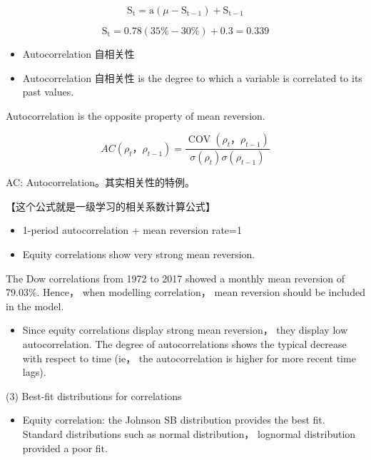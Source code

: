 \[
{\mathrm{S}}_{\mathrm{t}} = \mathrm{a}\left( {\mu  - {\mathrm{S}}_{\mathrm{t} - 1}}\right)  + {\mathrm{S}}_{\mathrm{t} - 1}
\]

\[
{\mathrm{S}}_{\mathrm{t}} = {0.78}\left( {{35}\%  - {30}\% }\right)  + {0.3} = {0.339}
\]


\begin{itemize}
\item Autocorrelation 自相关性
\end{itemize}

\begin{itemize}
\item Autocorrelation 自相关性 is the degree to which a variable is correlated to its past values.
\end{itemize}

 Autocorrelation is the opposite property of mean reversion.

\[
{AC}\left( {{\rho }_{t}，{\rho }_{t - 1}}\right)  = \frac{\operatorname{COV}\left( {{\rho }_{t}，{\rho }_{t - 1}}\right) }{\sigma \left( {\rho }_{t}\right) \sigma \left( {\rho }_{t - 1}\right) }
\]

AC: Autocorrelation。其实相关性的特例。

【这个公式就是一级学习的相关系数计算公式】

\begin{itemize}
\item 1-period autocorrelation + mean reversion rate=1
\end{itemize}

\begin{itemize}
\item Equity correlations show very strong mean reversion.
\end{itemize}

 The Dow correlations from 1972 to 2017 showed a monthly mean reversion of 79.03\%. Hence， when modelling correlation， mean reversion should be included in the model.

\begin{itemize}
\item Since equity correlations display strong mean reversion， they display low autocorrelation. The degree of autocorrelations shows the typical decrease with respect to time (ie， the autocorrelation is higher for more recent time lags).
\end{itemize}

(3) Best-fit distributions for correlations

\begin{itemize}
\item Equity correlation: the Johnson SB distribution provides the best fit. Standard distributions such as normal distribution， lognormal distribution provided a poor fit.
\end{itemize}


